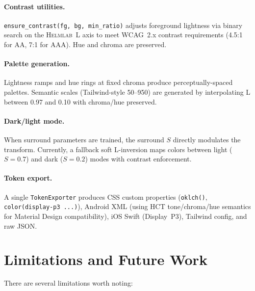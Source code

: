 \documentclass[11pt, twocolumn]{article}
\newcommand{\helmlab}{\textsc{Helmlab}}
\begin{document}
\paragraph{Contrast utilities.}
\texttt{ensure\_contrast(fg, bg, min\_ratio)} adjusts foreground
lightness via binary search on the \helmlab\ L axis to meet
WCAG~2.x contrast requirements (4.5:1 for AA, 7:1 for AAA).
Hue and chroma are preserved.

\paragraph{Palette generation.}
Lightness ramps and hue rings at fixed chroma produce
perceptually-spaced palettes. Semantic scales (Tailwind-style
50--950) are generated by interpolating L between 0.97 and 0.10
with chroma/hue preserved.

\paragraph{Dark/light mode.}
When surround parameters are trained, the surround $S$ directly
modulates the transform. Currently, a fallback soft L-inversion
maps colors between light ($S=0.7$) and dark ($S=0.2$) modes
with contrast enforcement.

\paragraph{Token export.}
A single \texttt{TokenExporter} produces CSS custom properties
(\texttt{oklch()}, \texttt{color(display-p3 ...)}), Android XML
(using HCT tone/chroma/hue semantics for Material Design
compatibility), iOS Swift (Display~P3), Tailwind config, and
raw JSON.


\section{Limitations and Future Work}
\label{sec:limitations}

There are several limitations worth noting:
\end{document}
